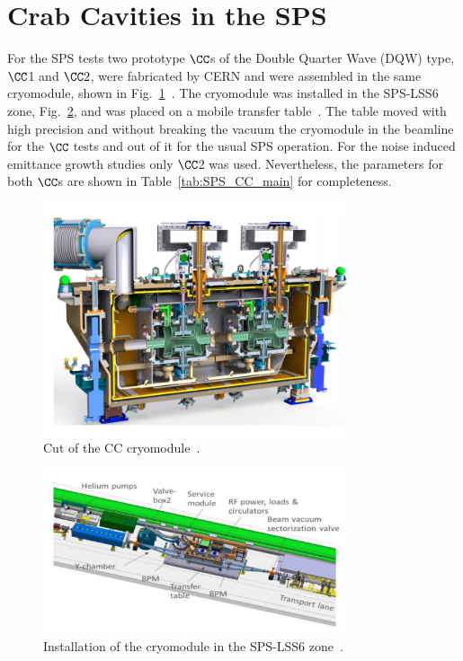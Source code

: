 \section{Crab Cavities in the SPS}\label{sec:CC_SPS_setup}

For the SPS tests two prototype $\CC$s of the Double Quarter Wave (DQW) type, $\CC$1 and $\CC2$, were fabricated by CERN and were assembled in the same cryomodule, shown in Fig.~\ref{fig:DQW_cryomodule}~\cite{Zanoni:2017}. The cryomodule was installed in the SPS-LSS6 zone, Fig.~\ref{fig:CC_SPS_LSS6}, and was placed on a mobile transfer table~\cite{Calaga:2649807}. The table moved with high precision and without breaking the vacuum the cryomodule in the beamline for the $\CC$ tests and out of it for the usual SPS operation. For the noise induced emittance growth studies only $\CC$2 was used. Nevertheless, the parameters for both $\CC$s are shown in Table~\ref{tab:SPS_CC_main} for completeness.


\begin{figure}[h]
   \centering         
   \includegraphics[width=0.8\textwidth]{images/Ch4/CC_cryomodule.png}
       \caption{Cut of the CC cryomodule~\cite{Zanoni:2017}.}
       \label{fig:DQW_cryomodule}
\end{figure}

\begin{figure}[h]
   \centering         
   \includegraphics[width=0.8\textwidth]{images/Ch4/CC_location_SPS_LSS6.png}
       \caption{Installation of the cryomodule in the SPS-LSS6 zone~\cite{Calaga:2649807}.}
       \label{fig:CC_SPS_LSS6}
\end{figure}

